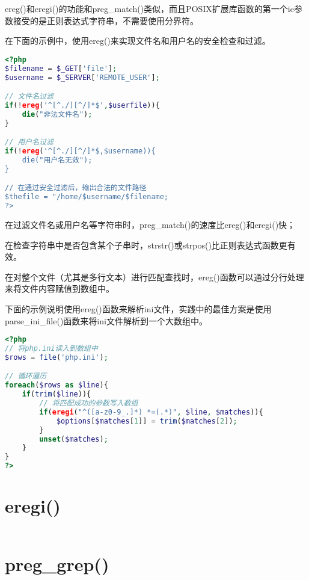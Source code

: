 ereg()和eregi()的功能和preg\_match()类似，而且POSIX扩展库函数的第一个ie参数接受的是正则表达式字符串，不需要使用分界符。

在下面的示例中，使用ereg()来实现文件名和用户名的安全检查和过滤。

\begin{lstlisting}[language=PHP]
<?php
$filename = $_GET['file'];
$username = $_SERVER['REMOTE_USER'];

// 文件名过滤
if(!ereg('^[^./][^/]*$',$userfile)){
	die("非法文件名");
}

// 用户名过滤
if(!ereg('^[^./][^/]*$,$username)){
	die("用户名无效");
}

// 在通过安全过滤后，输出合法的文件路径
$thefile = "/home/$username/$filename;
?>
\end{lstlisting}

\begin{compactitem}
\item 在过滤文件名或用户名等字符串时，preg\_match()的速度比ereg()和eregi()快；
\item 在检查字符串中是否包含某个子串时，strstr()或strpos()比正则表达式函数更有效。
\end{compactitem}


在对整个文件（尤其是多行文本）进行匹配查找时，ereg()函数可以通过分行处理来将文件内容赋值到数组中。

下面的示例说明使用ereg()函数来解析ini文件，实践中的最佳方案是使用parse\_ini\_file()函数来将ini文件解析到一个大数组中。

\begin{lstlisting}[language=PHP]
<?php
// 将php.ini读入到数组中
$rows = file('php.ini');

// 循环遍历
foreach($rows as $line){
	if(trim($line)){
		// 将匹配成功的参数写入数组
		if(eregi("^([a-z0-9_.]*) *=(.*)", $line, $matches)){
			$options[$matches[1]] = trim($matches[2]);
		}
		unset($matches);
	}
}
?>
\end{lstlisting}



\section{eregi()}


\begin{lstlisting}[language=PHP]

\end{lstlisting}


\section{preg\_grep()}





